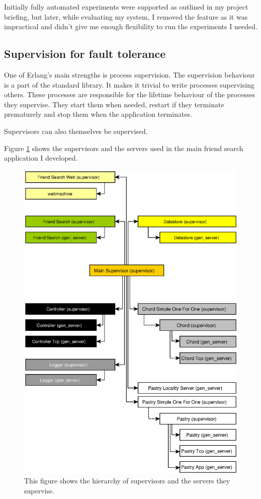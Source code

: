 Initially fully automated experiments were supported as outlined in my project briefing, but later, while evaluating my system, I removed the feature as it was impractical and didn't give me enough flexibility to run the experiments I needed.

\subsection{Supervision for fault tolerance}
One of Erlang's main strengths is process supervision.
The supervision behaviour is a part of the standard library. It makes it trivial to write processes supervising others. These processes are responsible for the lifetime behaviour of the processes they supervise. They start them when needed, restart if they terminate prematurely and stop them when the application terminates.

Supervisors can also themselves be supervised.

Figure \ref{figSupervisionTree} shows the supervisors and the servers used in the main friend search application I developed.

\begin{figure}[!htb]
\begin{center}
	\includegraphics[width=0.9\linewidth]{illustrations/ClientSupervisionTree.eps}
  \caption{This figure shows the hierarchy of supervisors and the servers they supervise.}
  \label{figSupervisionTree}
\end{center}
\end{figure}

